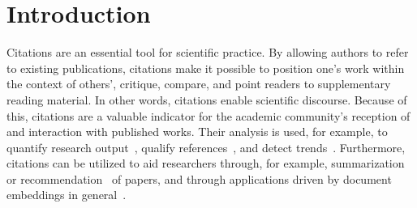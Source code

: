 
\section{Introduction}

Citations are an essential tool for scientific practice. By allowing authors to refer to existing publications, citations make it possible to position one's work within the context of others', critique, compare, and point readers to supplementary reading material. In other words, citations enable scientific discourse. Because of this, citations are a valuable indicator for the academic community's reception of and interaction with published works. Their analysis is used, for example, to quantify research output~\cite{Hirsch2005}, qualify references~\cite{Abujbara2013}, and detect trends~\cite{Chen2006}. Furthermore, citations can be utilized to aid researchers through, for example, summarization~\cite{Elkiss2008} or recommendation~\cite{Ma2020,Faerber202x} of papers, and through applications driven by document embeddings in general~\cite{Cohan2020}.

